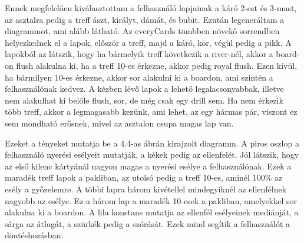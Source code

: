 Ennek megfelelően kiválasztottam a felhasználó lapjainak a káró 2-est és 3-mast, az asztalra pedig a treff ászt, királyt, dámát, és bubit. Ezután legeneráltam a diagrammot, ami alább látható. Az everyCards tömbben növekő sorrendben helyezkednek el a lapok, először a treff, majd a káró, kör, végül pedig a pikk. A lapokból az látszik, hogy ha bármelyik treff következik a river-nél, akkor a board-on flush alakulna ki, ha a treff 10-es érkezne, akkor pedig royal flush. Ezen kívül, ha bármilyen 10-es érkezne, akkor sor alakulni ki a boardon, ami szintén a felhasználónak kedvez. A kézben lévő lapok a lehető legalacsonyabbak, illetve nem alakulhat ki belőle flush, sor, de még csak egy drill sem. Ha nem érkezik több treff, akkor a legmagasabb kezünk, ami lehet, az egy hármas pár, viszont ez sem mondható erősnek, mivel az asztalon csupa magas lap van. 

Ezeket a tényeket mutatja be a 4.4-as ábrán kirajzolt diagramm. A piros oszlop a felhasználó nyerési esélyeit mutatják, a kékek pedig az ellenfelét. Jól látszik, hogy az első kilenc kártyánál nagyon magas a nyerési esélye a felhasználónak. Ezek a maradék treff lapok a pakliban, az utolsó pedig a treff 10-es, aminél 100\% az esély a győzelemre. A többi lapra három kivétellel mindegyiknél az ellenfélnek nagyobb az esélye. Ez a három lap a maradék 10-esek a pakliban, amelyekkel sor alakulna ki a boardon. A lila konstans mutatja az ellenfél esélyeinek mediánját, a sárga az átlagát, a szürkék pedig a szórását. Ezek mind segítik a felhasználót a döntéshozásban.